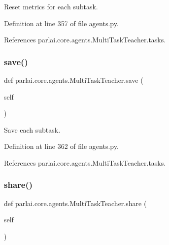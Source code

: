 \begin{DoxyVerb}Reset metrics for each subtask.\end{DoxyVerb}
 

Definition at line 357 of file agents.\+py.



References parlai.\+core.\+agents.\+Multi\+Task\+Teacher.\+tasks.

\mbox{\label{classparlai_1_1core_1_1agents_1_1MultiTaskTeacher_abb082dd4c5be92b7ce7683b16d0abd2c}} 
\subsubsection{\texorpdfstring{save()}{save()}}
{\footnotesize\ttfamily def parlai.\+core.\+agents.\+Multi\+Task\+Teacher.\+save (\begin{DoxyParamCaption}\item[{}]{self }\end{DoxyParamCaption})}

\begin{DoxyVerb}Save each subtask.\end{DoxyVerb}
 

Definition at line 362 of file agents.\+py.



References parlai.\+core.\+agents.\+Multi\+Task\+Teacher.\+tasks.

\mbox{\label{classparlai_1_1core_1_1agents_1_1MultiTaskTeacher_adbd1854cad9eb58ba1c7736b44bf5e96}} 
\subsubsection{\texorpdfstring{share()}{share()}}
{\footnotesize\ttfamily def parlai.\+core.\+agents.\+Multi\+Task\+Teacher.\+share (\begin{DoxyParamCaption}\item[{}]{self }\end{DoxyParamCaption})}


